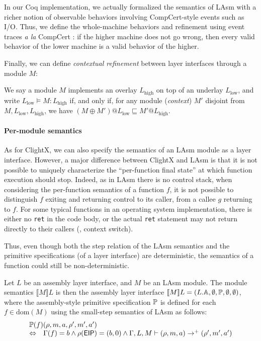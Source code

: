 In our Coq implementation, we actually formalized the semantics of
LAsm with a richer notion of observable behaviors involving
CompCert-style events such as I/O. Thus, we define the
whole-machine behaviors and refinement using event traces 
{\em a la} CompCert \cite[3.5 sqq.]{Leroy-backend}: if the higher machine does
not go wrong, then every valid behavior of the lower machine is a
valid behavior of the higher.

Finally, we can define \emph{contextual refinement} between layer interfaces through a module $M$:

\begin{definition}
We say a module $M$ implements an overlay $L_{\text{high}}$ on top of an
underlay $L_{\text{low}}$, and write $ L_{\text{low}} \vDash M :
L_{\text{high}} $ if, and only if, for any module (\emph{context}) $M'$ disjoint from $M, L_{\text{low}}, L_{\text{high}}$,
we have $(M \oplus M')@L_{\text{low}} \sqsubseteq M'@L_{\text{high}}$.
\end{definition}

\paragraph{Per-module semantics}
As for ClightX, we can also specify the semantics of an LAsm module as
a layer interface. However, a major difference between ClightX and
LAsm is that it is not possible to uniquely characterize the
``per-function final state'' at which function execution should
stop. Indeed, as in LAsm there is no control stack, when considering
the per-function semantics of a function $f$, it is not possible to
distinguish $f$ exiting and returning control to its caller, from a
callee $g$ returning to $f$. 
For some typical functions in an operating system implementation,
there is either no \verb+ret+ in the code body, or the actual 
\verb+ret+ statement may not return directly to their callers (\eg, context switch).


Thus, even though both the step relation of the LAsm 
semantics and the primitive
specifications (of a layer interface) are deterministic, 
the semantics of a function could still be non-deterministic.

\begin{definition}
Let $L$ be an
assembly layer interface, and $M$ be an LAsm module. The
module semantics $\llbracket M \rrbracket L$ %
is then the
assembly layer interface $\llbracket M \rrbracket L = (L.\mathbb{A}, \emptyset, \mathbb{P},\emptyset,\emptyset)$,
where the assembly-style primitive specification $\mathbb{P}$ is defined for each $f
\in \mathrm{dom}(M)$ using the small-step semantics of LAsm as follows:
\[
\begin{array}{ll}
\multicolumn{2}{l}{\primt(f)(\rho, m, a, \rho', m', a')} \\
\Leftrightarrow & \Gamma(f) = b \land \rho(\mathsf{EIP}) = (b, 0)  \land \Gamma, L, M \vdash (\rho, m, a) \rightarrow^+ (\rho', m', a')
\end{array}
\]
\end{definition}

